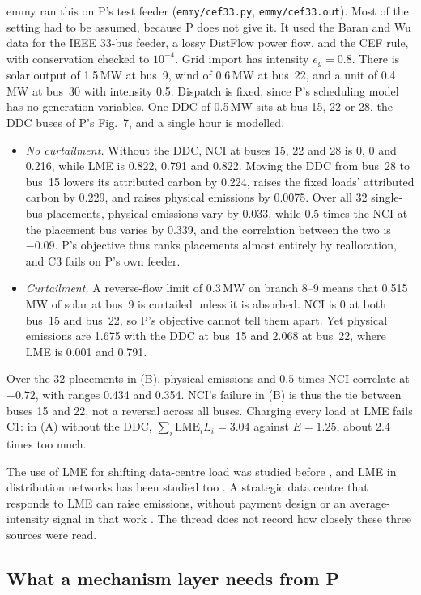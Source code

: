 \documentclass{article}
\begin{document}
emmy ran this on P's test feeder (\texttt{emmy/cef33.py}, \texttt{emmy/cef33.out}).
Most of the setting had to be assumed, because P does not give it.
It used the Baran and Wu data for the IEEE 33-bus feeder, a lossy DistFlow power flow, and the CEF rule, with conservation checked to \(10^{-4}\).
Grid import has intensity \(e_g=0.8\).
There is solar output of 1.5\,MW at bus~9, wind of 0.6\,MW at bus~22, and a unit of 0.4\,MW at bus~30 with intensity 0.5.
Dispatch is fixed, since P's scheduling model has no generation variables.
One DDC of 0.5\,MW sits at bus 15, 22 or 28, the DDC buses of P's Fig.~7, and a single hour is modelled.
\begin{itemize}
\item[(A)] \emph{No curtailment.} Without the DDC, NCI at buses 15, 22 and 28 is 0, 0 and 0.216, while LME is 0.822, 0.791 and 0.822. Moving the DDC from bus~28 to bus~15 lowers its attributed carbon by 0.224, raises the fixed loads' attributed carbon by 0.229, and raises physical emissions by 0.0075. Over all 32 single-bus placements, physical emissions vary by 0.033, while \(0.5\) times the NCI at the placement bus varies by 0.339, and the correlation between the two is \(-0.09\). P's objective thus ranks placements almost entirely by reallocation, and C3 fails on P's own feeder.
\item[(B)] \emph{Curtailment.} A reverse-flow limit of 0.3\,MW on branch 8--9 means that 0.515\,MW of solar at bus~9 is curtailed unless it is absorbed. NCI is 0 at both bus~15 and bus~22, so P's objective cannot tell them apart. Yet physical emissions are 1.675 with the DDC at bus~15 and 2.068 at bus~22, where LME is 0.001 and 0.791.
\end{itemize}
Over the 32 placements in (B), physical emissions and \(0.5\) times NCI correlate at \(+0.72\), with ranges 0.434 and 0.354.
NCI's failure in (B) is thus the tie between buses 15 and 22, not a reversal across all buses.
Charging every load at LME fails C1: in (A) without the DDC, \(\sum_i\mathrm{LME}_iL_i=3.04\) against \(E=1.25\), about 2.4 times too much.

The use of LME for shifting data-centre load was studied before \cite{arxiv201003379}, and LME in distribution networks has been studied too \cite{arxiv240207379}.
A strategic data centre that responds to LME can raise emissions, without payment design or an average-intensity signal in that work \cite{arxiv251020805}.
The thread does not record how closely these three sources were read.

\subsection{What a mechanism layer needs from P}\label{sec:layer}
\end{document}

